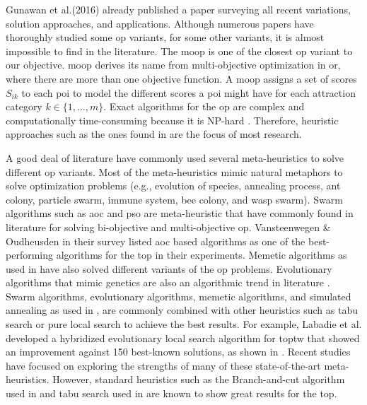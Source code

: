 Gunawan et al.(2016) \parencite{OP_Solution_Gunawan} already published a paper surveying all recent variations, solution approaches, and applications. Although numerous papers have thoroughly studied some \gls{op} variants, for some other variants, it is almost impossible to find in the literature. The \gls{moop} is one of the closest \gls{op} variant to our objective. \Gls{moop} derives its name from multi-objective optimization in \gls{or}, where there are more than one objective function. A \gls{moop} assigns a set of scores $S_{ik}$ to each \gls{poi} to model the different scores a \gls{poi} might have for each attraction category $k \in \{1,...,m\}$. Exact algorithms for the \gls{op} are complex and computationally time-consuming because it is NP-hard \parencite{Golden1987TheProblem}. Therefore, heuristic approaches such as the ones found in \parencite{T.1984HeuristicOrienteering, Golden1987TheProblem, Ramesh1991AnProblem,Souffriau2008AGuides} are the focus of most research. 

A good deal of literature have commonly used several meta-heuristics to solve different \gls{op} variants. Most of the meta-heuristics mimic natural metaphors to solve optimization problems (e.g., evolution of species, annealing process, ant colony, particle swarm, immune system, bee colony, and wasp swarm). Swarm algorithms such as \Gls{aoc}  \parencite{Ke2008AntsProblem, Wagner2016StealingProblem, Mukhina2019OrienteeringConstruction, Martin-Moreno2018Multi-ObjectiveProblem} and \gls{pso} \parencite{Sevkli2010StPSO:Optimization, Wagner2016StealingProblem, Schilde2009MetaheuristicsProblem} are meta-heuristic that have commonly found in literature for solving bi-objective and multi-objective \gls{op}. Vansteenwegen \& Oudheusden \parencite{Vansteenwegen2011TheSurvey}  in their survey listed \gls{aoc} based algorithms as one of the best-performing algorithms for the \gls{top} in their experiments. Memetic algorithms as used in \parencite{Lu2018AConstraints,Bouly2010AProblem, Divsalar2014ASelection} have also solved different variants of the \gls{op} problems. Evolutionary algorithms that mimic genetics are also an algorithmic trend in literature \parencite{Wu2018EvolutionaryProblem, Faeda2020AProblem, Kobeaga2018AnProblem}. Swarm algorithms, evolutionary algorithms, memetic algorithms, and simulated annealing as used in \parencite{Pan2018IndependentTourist}, are commonly combined with other heuristics such as tabu search \parencite{Lu2018AConstraints} or pure local search \parencite{Divsalar2014ASelection, Bouly2010AProblem} to achieve the best results. For example, Labadie et al. \parencite{Labadie2011HybridizedWindows} developed a hybridized evolutionary local search algorithm for \gls{toptw} that showed an improvement against 150 best-known solutions, as shown in \parencite{OP_Solution_Gunawan}. Recent studies have focused on exploring the strengths of many of these state-of-the-art meta-heuristics.  However, standard heuristics such as the Branch-and-cut algorithm used in  \parencite{Dang2013AProblem} and tabu search used in  \parencite{E.2005AProblem} are known to show great results for the \gls{top}. 

